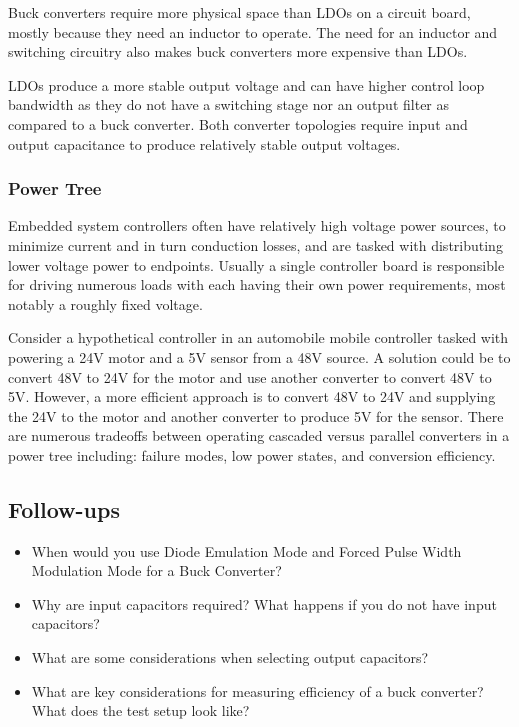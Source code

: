 \documentclass[main.tex]{subfiles}
\begin{document}
Buck converters require more physical space than LDOs on a circuit board, mostly because they need an inductor to operate. The need for an inductor and switching circuitry also makes buck converters more expensive than LDOs. 

LDOs produce a more stable output voltage and can have higher control loop bandwidth as they do not have a switching stage nor an output filter as compared to a buck converter. Both converter topologies require input and output capacitance to produce relatively stable output voltages.

\subsubsection{Power Tree}
Embedded system controllers often have relatively high voltage power sources, to minimize current and in turn conduction losses, and are tasked with distributing lower voltage power to endpoints. Usually a single controller board is responsible for driving numerous loads with each having their own power requirements, most notably a roughly fixed voltage. 

Consider a hypothetical controller in an automobile mobile controller tasked with powering a 24V motor and a 5V sensor from a 48V source. A solution could be to convert 48V to 24V for the motor and use another converter to convert 48V to 5V. However, a more efficient approach is to convert 48V to 24V and supplying the 24V to the motor and another converter to produce 5V for the sensor. There are numerous tradeoffs between operating cascaded versus parallel converters in a power tree including: failure modes, low power states, and conversion efficiency. 

\subsection{Follow-ups}
\begin{itemize}
    \item When would you use Diode Emulation Mode and Forced Pulse Width Modulation Mode for a Buck Converter?  %
    \item Why are input capacitors required? What happens if you do not have input capacitors? %
    \item What are some considerations when selecting output capacitors? %
    \item What are key considerations for measuring efficiency of a buck converter? What does the test setup look like? %
\end{itemize}
\end{document}
